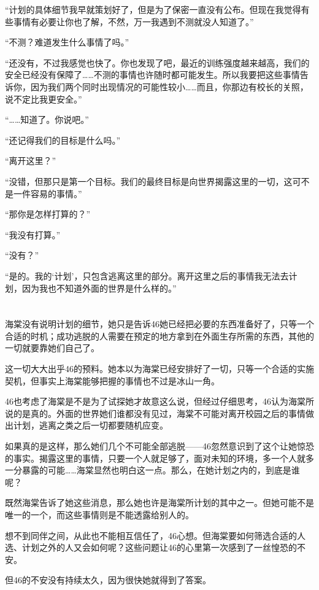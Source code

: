  “计划的具体细节我早就策划好了，但是为了保密一直没有公布。但现在我觉得有些事情有必要让你也了解，不然，万一我遇到不测就没人知道了。”

“不测？难道发生什么事情了吗。”

“还没有，不过我感觉也快了。你也发现了吧，最近的训练强度越来越高，我们的安全已经没有保障了……不测的事情也许随时都可能发生。所以我要把这些事情告诉你，因为我们两个同时出现情况的可能性较小……而且，你那边有校长的关照，说不定比我更安全。”

“……知道了。你说吧。”

“还记得我们的目标是什么吗。”

“离开这里？”

“没错，但那只是第一个目标。我们的最终目标是向世界揭露这里的一切，这可不是一件容易的事情。”

“那你是怎样打算的？”

“我没有打算。”

“没有？”

“是的。我的‘计划’，只包含逃离这里的部分。离开这里之后的事情我无法去计划，因为我也不知道外面的世界是什么样的。”

\section*{}

海棠没有说明计划的细节，她只是告诉46她已经把必要的东西准备好了，只等一个合适的时机；成功逃脱的人需要在预定的地方拿到在外面生存所需的东西，其他的一切就要靠她们自己了。

这一切大大出乎46的预料。她本以为海棠已经安排好了一切，只等一个合适的实施契机，但事实上海棠能够把握的事情也不过是冰山一角。

46也考虑了海棠是不是为了试探她才故意这么说，但经过仔细思考，46认为海棠所说的是真的。外面的世界她们谁都没有见过，海棠不可能对离开校园之后的事情做出计划，逃离之类之后一切都要随机应变。

如果真的是这样，那么她们几个不可能全部逃脱——46忽然意识到了这个让她惊恐的事实。揭露这里的事情，只要一个人就足够了，面对未知的环境，多一个人就多一分暴露的可能……海棠显然也明白这一点。那么，在她计划之内的，到底是谁呢？

既然海棠告诉了她这些消息，那么她也许是海棠所计划的其中之一。但她可能不是唯一的一个，而这些事情则是不能透露给别人的。

想不到同伴之间，从此也不能相互信任了，46心想。但海棠要如何筛选合适的人选、计划之外的人又会如何呢？这些问题让46的心里第一次感到了一丝惶恐的不安。

但46的不安没有持续太久，因为很快她就得到了答案。

